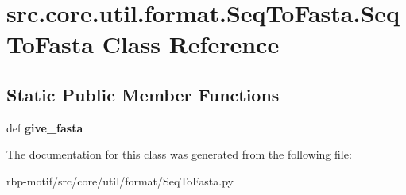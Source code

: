 \hypertarget{classsrc_1_1core_1_1util_1_1format_1_1SeqToFasta_1_1SeqToFasta}{\section{src.\-core.\-util.\-format.\-Seq\-To\-Fasta.\-Seq\-To\-Fasta Class Reference}
\label{classsrc_1_1core_1_1util_1_1format_1_1SeqToFasta_1_1SeqToFasta}
}
\subsection*{Static Public Member Functions}
\begin{DoxyCompactItemize}
\item 
\hypertarget{classsrc_1_1core_1_1util_1_1format_1_1SeqToFasta_1_1SeqToFasta_a37b9736991ebeb3e19e301c2618afe59}{def {\bfseries give\-\_\-fasta}}\label{classsrc_1_1core_1_1util_1_1format_1_1SeqToFasta_1_1SeqToFasta_a37b9736991ebeb3e19e301c2618afe59}

\end{DoxyCompactItemize}


The documentation for this class was generated from the following file\-:\begin{DoxyCompactItemize}
\item 
rbp-\/motif/src/core/util/format/Seq\-To\-Fasta.\-py\end{DoxyCompactItemize}
